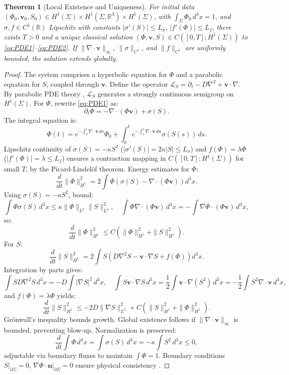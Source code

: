 \documentclass[12pt]{article}
\newtheorem{theorem}{Theorem}
\begin{document}
\begin{theorem}[Local Existence and Uniqueness]
\label{thm:well-posedness}
For initial data \((\Phi_0, \mathbf{v}_0, S_0) \in H^1(\Sigma) \times H^1(\Sigma, \mathbb{R}^3) \times H^1(\Sigma)\), with \(\int_\Sigma \Phi_0 \, d^3x = 1\), and \(\sigma, f \in C^1(\mathbb{R})\) Lipschitz with constants \(|\sigma'(S)| \leq L_\sigma\), \(|f'(\Phi)| \leq L_f\), there exists \(T > 0\) and a unique classical solution \((\Phi, \mathbf{v}, S) \in C([0, T]; H^1(\Sigma))\) to \eqref{eq:PDE1}--\eqref{eq:PDE2}. If \(\|\nabla \cdot \mathbf{v}\|_\infty\), \(\|\sigma\|_{C^1}\), and \(\|f\|_{C^1}\) are uniformly bounded, the solution extends globally.
\end{theorem}

\begin{proof}
The system comprises a hyperbolic equation for \(\Phi\) and a parabolic equation for \(S\), coupled through \(\mathbf{v}\). Define the operator \(\mathcal{L}_S = \partial_t - D \nabla^2 + \mathbf{v} \cdot \nabla\). By parabolic PDE theory \cite{Risken1996}, \(\mathcal{L}_S\) generates a strongly continuous semigroup on \(H^1(\Sigma)\). For \(\Phi\), rewrite \eqref{eq:PDE1} as:
\[
\partial_t \Phi = -\nabla \cdot (\Phi \mathbf{v}) + \sigma(S).
\]
The integral equation is:
\[
\Phi(t) = e^{-\int_0^t \nabla \cdot \mathbf{v} \, ds} \Phi_0 + \int_0^t e^{-\int_s^t \nabla \cdot \mathbf{v} \, du} \sigma(S(s)) \, ds.
\]
Lipschitz continuity of \(\sigma(S) = -\kappa S^2\) (\(|\sigma'(S)| = 2 \kappa |S| \leq L_\sigma\)) and \(f(\Phi) = \lambda \Phi\) (\(|f'(\Phi)| = \lambda \leq L_f\)) ensures a contraction mapping in \(C([0, T]; H^1(\Sigma))\) for small \(T\), by the Picard-Lindelöf theorem. Energy estimates for \(\Phi\):
\[
\frac{d}{dt} \|\Phi\|_{H^1}^2 = 2 \int \Phi \left( \sigma(S) - \nabla \cdot (\Phi \mathbf{v}) \right) d^3x.
\]
Using \(\sigma(S) = -\kappa S^2\), bound:
\[
\int \Phi \sigma(S) \, d^3x \leq \kappa \|\Phi\|_{L^2} \|S\|_{L^4}^2, \quad \int \Phi \nabla \cdot (\Phi \mathbf{v}) \, d^3x = -\int \nabla \Phi \cdot (\Phi \mathbf{v}) \, d^3x,
\]
so:
\[
\frac{d}{dt} \|\Phi\|_{H^1}^2 \leq C (\|\Phi\|_{H^1}^2 + \|S\|_{H^1}^2).
\]
For \(S\):
\[
\frac{d}{dt} \|S\|_{H^1}^2 = 2 \int S \left( D \nabla^2 S - \mathbf{v} \cdot \nabla S + f(\Phi) \right) d^3x.
\]
Integration by parts gives:
\[
\int S D \nabla^2 S \, d^3x = -D \int |\nabla S|^2 \, d^3x, \quad \int S \mathbf{v} \cdot \nabla S \, d^3x = \frac{1}{2} \int \mathbf{v} \cdot \nabla (S^2) \, d^3x = -\frac{1}{2} \int S^2 \nabla \cdot \mathbf{v} \, d^3x,
\]
and \(f(\Phi) = \lambda \Phi\) yields:
\[
\frac{d}{dt} \|S\|_{H^1}^2 \leq -2D \|\nabla S\|_{L^2}^2 + C (\|S\|_{H^1}^2 + \|\Phi\|_{H^1}^2).
\]
Grönwall’s inequality bounds growth. Global existence follows if \(\|\nabla \cdot \mathbf{v}\|_\infty\) is bounded, preventing blow-up. Normalization is preserved:
\[
\frac{d}{dt} \int \Phi \, d^3x = \int \sigma(S) \, d^3x = -\kappa \int S^2 \, d^3x \leq 0,
\]
adjustable via boundary fluxes to maintain \(\int \Phi = 1\). Boundary conditions \(S|_{\partial \Sigma} = 0\), \(\nabla \Phi \cdot \mathbf{n}|_{\partial \Sigma} = 0\) ensure physical consistency \cite{Risken1996}.
\end{proof}
\end{document}
